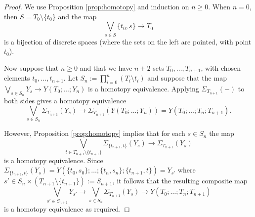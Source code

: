 \documentclass[12pt]{amsart}
\theoremstyle{definition}
\newcommand{\<}{\langle}
\renewcommand{\>}{\rangle}
\newcommand{\mc}[2]{\Sigma_{#1}(#2)}
\begin{document}
\begin{proof} We use Proposition \ref{prop:homotopy} and induction on $n\geq 0$. When $n=0$,  then $S=T_0\setminus\{ t_0\}$ and the map 
\[
\bigvee_{s\in S}\{ t_0,s\}\to T_0
\]
is a bijection of discrete spaces (where the sets on the left are pointed, with point $t_0$).

Now suppose that $n\geq 0$ and that we have $n+2$ sets $T_0,\ldots, T_{n+1}$, with chosen elements $t_0,\ldots,t_{n+1}$. 
Let $S_n:= \prod_{i=0}^n(T_i\setminus{t_i})$ and suppose that the map $\bigvee_{s\in S_n}Y_{s}\to Y(T_0;\ldots;Y_n)$ is a homotopy equivalence.
Applying $\mc{T_{n+1}}{-}$ to both sides gives a homotopy equivalence
\[
\bigvee_{s\in S_n}\mc{T_{n+1}}{Y_{s}}\longrightarrow \mc{T_{n+1}}{Y(T_0;\ldots;Y_n)}=Y(T_0;\ldots;T_n;T_{n+1}).
\]

However, Proposition \ref{prop:homotopy}  implies that for each $s\in S_n$ the map
\[
\bigvee_{t\in T_{n+1}\setminus\{ t_{n+1}\}}\mc{\{ t_{n+1},t\}}{Y_s}\longrightarrow \mc{T_{n+1}}{Y_{s}}
\]
is a homotopy equivalence. Since $\mc{\{ t_{n+1},t\}}{Y_{s}}=Y(\{ t_0,s_0\};\ldots ;\{ t_n,s_n\} ;\{ t_{n+1},t\})=Y_{s'}$
where $s'\in S_n\times (T_{n+1}\setminus\{t_{n+1}\}):=S_{n+1}$,
 it follows that the resulting  composite map
\[
\bigvee_{s'\in S_{n+1}}Y_{s'}\longrightarrow 
\bigvee_{s\in S_n}\mc{T_{n+1}}{Y_{s}}\longrightarrow Y(T_0;\ldots;T_n;T_{n+1})
\]
is a homotopy equivalence as required.
\end{proof}
\end{document}
